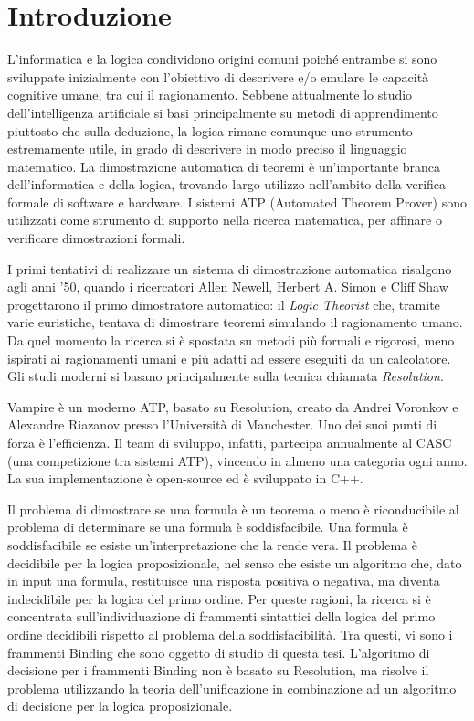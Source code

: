 \documentclass[./main.tex]{subfiles}
\begin{document}
\chapter*{Introduzione}


L'informatica e la logica condividono origini comuni poiché 
entrambe si sono sviluppate inizialmente con l'obiettivo di descrivere e/o 
emulare le capacità cognitive umane, tra cui il ragionamento.
Sebbene attualmente lo studio dell'intelligenza artificiale si basi principalmente su metodi di apprendimento 
piuttosto che sulla deduzione, la logica rimane comunque uno strumento estremamente utile,
in grado di descrivere in modo preciso il linguaggio matematico.
La dimostrazione automatica di teoremi è un'importante branca dell'informatica e della logica,
trovando largo utilizzo nell'ambito della verifica formale di software e hardware.
I sistemi ATP (Automated Theorem Prover) sono utilizzati come strumento di supporto 
nella ricerca matematica, per affinare o verificare dimostrazioni formali.
%

I primi tentativi di realizzare un sistema 
di dimostrazione automatica risalgono agli anni '50,
quando i ricercatori Allen Newell, Herbert A. Simon e Cliff Shaw
progettarono il primo dimostratore automatico: il \textit{Logic Theorist}
che, tramite varie euristiche, tentava di dimostrare teoremi simulando il ragionamento umano. 
Da quel momento la ricerca si è spostata su metodi più formali e rigorosi,
meno ispirati ai ragionamenti umani e più adatti ad essere eseguiti da un calcolatore.
Gli studi moderni si basano principalmente sulla tecnica chiamata \textit{Resolution}.
%  

Vampire è un moderno ATP, basato su Resolution, creato da Andrei Voronkov e Alexandre Riazanov presso l'Università di Manchester.
Uno dei suoi punti di forza è l’efficienza. Il team di sviluppo, infatti, partecipa
annualmente al CASC (una competizione tra sistemi ATP),
vincendo in almeno una categoria ogni anno.
La sua implementazione è open-source ed è sviluppato in C++.

%

Il problema di dimostrare se una formula è un teorema o meno è riconducibile al problema di determinare
se una formula è soddisfacibile.
Una formula è soddisfacibile se esiste un'interpretazione che la rende vera.
Il problema è decidibile per la logica proposizionale, nel senso che esiste un algoritmo
che, dato in input una formula, restituisce una risposta positiva o negativa,
ma diventa indecidibile per la logica del primo ordine.
Per queste ragioni, la ricerca si è concentrata sull'individuazione di frammenti sintattici della logica del primo ordine
decidibili rispetto al problema della soddisfacibilità.
Tra questi, vi sono i frammenti Binding che sono oggetto di studio di questa tesi.
L'algoritmo di decisione per i frammenti Binding non è basato su Resolution,
ma risolve il problema utilizzando la teoria dell'unificazione in combinazione 
ad un algoritmo di decisione per la logica proposizionale.
\end{document}
